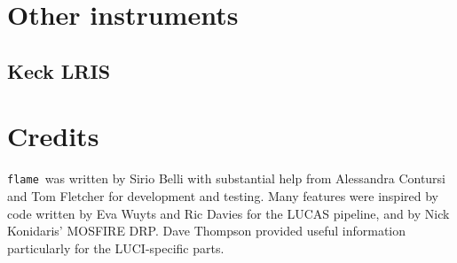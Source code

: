 \documentclass[a4paper, notitlepage]{article}
\newcommand{\flame}{\texttt{flame}}
\begin{document}

\section{Other instruments}
\label{sec:other_instruments}

\subsection{Keck LRIS}




\vspace{10mm}

\section*{Credits}

\flame\ was written by Sirio Belli with substantial help from Alessandra Contursi and Tom Fletcher for development and testing. Many features were inspired by code written by Eva Wuyts and Ric Davies for the LUCAS pipeline, and by Nick Konidaris' MOSFIRE DRP. Dave Thompson provided useful information particularly for the LUCI-specific parts.
\end{document}
